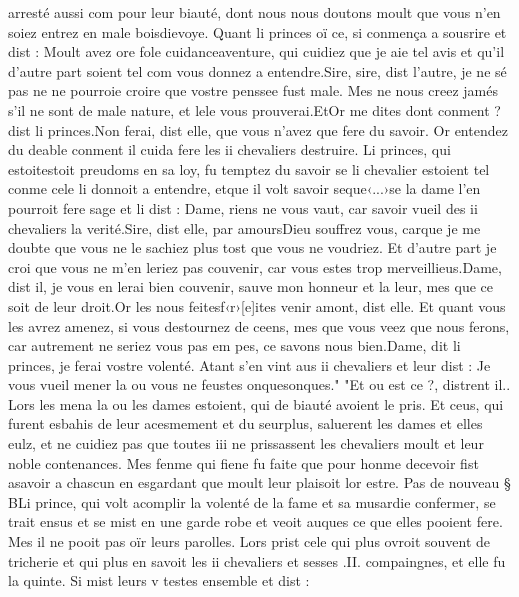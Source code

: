 \documentclass{article}
\begin{document}
\begin{pages}
      arresté aussi com pour leur biauté, dont nous nous doutons moult que vous n’en soiez entrez en male 
      boisdievoye.
   Quant li princes oï ce, si conmença a sousrire et dist :
   Moult avez ore fole cuidanceaventure, 
      qui cuidiez que je aie tel avis et qu’il d’autre part soient tel com vous donnez a entendre.Sire, sire, dist l’autre, je ne sé pas ne 
      ne pourroie croire que vostre penssee fust male. Mes ne nous creez jamés s’il ne sont de male nature, et 
      lele vous prouverai.EtOr me dites dont conment ? 
      dist li princes.Non ferai, dist elle, que vous n’avez que fere du savoir. \pend 
\pstart Or entendez du deable conment il cuida fere les ii chevaliers destruire. 
   Li princes, qui 
   estoitestoit preudoms en sa loy, fu temptez du savoir se li chevalier 
   estoient tel conme cele li donnoit a entendre, etque il volt savoir 
   seque‹...›se la dame l’en pourroit fere sage et li dist :
   Dame, riens ne vous vaut, car savoir 
      vueil des ii chevaliers la verité.Sire, dist elle, par amoursDieu souffrez 
      vous, carque je me doubte que vous ne le sachiez plus tost que 
      vous ne voudriez. Et d’autre part je croi que vous ne m’en leriez pas couvenir, car vous estes trop merveillieus.Dame, dist il, je vous en lerai bien couvenir, sauve mon honneur et la leur, mes que ce soit de leur 
      droit.Or les nous feitesf‹r›[e]ites venir amont, 
      dist elle. Et quant vous les avrez amenez, si vous destournez de ceens, mes que vous veez que nous ferons, car autrement ne seriez 
      vous pas em pes, ce savons nous bien.Dame, dit li princes, je ferai vostre volenté.
   Atant s’en vint aus ii chevaliers et leur dist :
   Je vous vueil mener la ou vous ne feustes 
      onquesonques." "Et ou est ce ?, distrent il..
   Lors les mena la ou les dames estoient, qui de biauté avoient le pris. 
   Et ceus, qui furent esbahis de leur acesmement et du seurplus, saluerent les dames et elles eulz, et ne cuidiez pas que toutes 
   iii ne prissassent les chevaliers moult et leur noble contenances. Mes fenme qui 
   fiene fu faite que pour honme decevoir fist asavoir a chascun 
   en esgardant que moult leur plaisoit lor estre. \pend 
\pstart Pas de nouveau § BLi prince, 
   qui volt acomplir la volenté de la fame et sa musardie confermer, 
   se trait ensus et se mist en une garde robe et veoit auques ce que elles pooient fere. Mes il ne pooit pas oïr leurs parolles. 
   Lors prist cele qui plus ovroit souvent de tricherie 
   et qui plus en savoit les ii chevaliers et 
   sesses .II. compaingnes, et elle fu la quinte. 
   Si mist leurs v testes ensemble et dist :

\end{pages}
\end{document}
